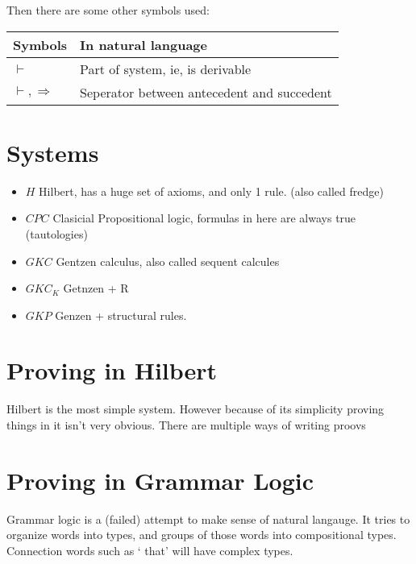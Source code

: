 \documentclass{article}
\begin{document}
Then there are some other symbols used:

\noindent
\begin{tabular}{@{}ll@{}}
Symbols&
In natural language \\ \toprule
$\vdash$ 					& Part of system, ie, is derivable \\
$\vdash, \Rightarrow$ 		& Seperator between antecedent and succedent\\ \bottomrule
\end{tabular}


\section{Systems}
\begin{itemize}
	\item $H$  Hilbert, has a huge set of axioms, and only 1 rule. (also called fredge)
	\item $CPC$ Clasicial Propositional logic, formulas in here are always true
(tautologies)
	\item $GKC$ Gentzen calculus, also called sequent calcules
	\item $GKC_K$  Getnzen + R 
	\item $GKP$ Genzen + structural rules.
\end{itemize}

\section{Proving in Hilbert}
Hilbert is the most simple system. However because of its simplicity proving
things in it isn't very obvious. There are multiple ways of writing proovs

\section{Proving in Grammar Logic}
Grammar logic is a (failed) attempt to make sense of natural langauge. It
tries to organize words into types, and groups of those words into compositional
types.
Connection words such as ` that' will have complex types.
\end{document}
